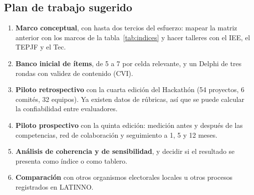 \documentclass[11pt,a4paper]{article}
\begin{document}
\subsection{Plan de trabajo sugerido}
\begin{enumerate}
  \item \textbf{Marco conceptual}, con hasta dos tercios del esfuerzo: mapear la matriz anterior con los marcos de la tabla~\ref{tab:indices} y hacer talleres con el IEE, el TEPJF y el Tec.
  \item \textbf{Banco inicial de ítems}, de 5 a 7 por celda relevante, y un Delphi de tres rondas con validez de contenido (CVI).
  \item \textbf{Piloto retrospectivo} con la cuarta edición del Hackathón (54 proyectos, 6 comités, 32 equipos). Ya existen datos de rúbricas, así que se puede calcular la confiabilidad entre evaluadores.
  \item \textbf{Piloto prospectivo} con la quinta edición: medición antes y después de las competencias, red de colaboración y seguimiento a 1, 5 y 12 meses.
  \item \textbf{Análisis de coherencia y de sensibilidad}, y decidir si el resultado se presenta como índice o como tablero.
  \item \textbf{Comparación} con otros organismos electorales locales u otros procesos registrados en LATINNO.
\end{enumerate}

\end{document}
